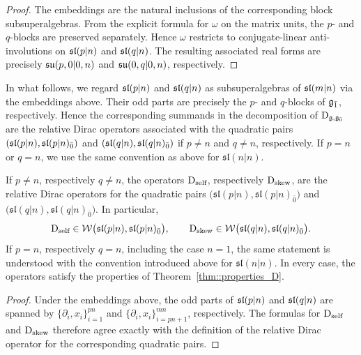  \begin{proof}
The embeddings are the natural inclusions of the corresponding block
subsuperalgebras. From the explicit formula for $\omega$ on the matrix
units, the $p$- and $q$-blocks are preserved separately. Hence $\omega$
restricts to conjugate-linear anti-involutions on
$\sl(p\vert n)$ and $\sl(q\vert n)$. The resulting associated real
forms are precisely $\su(p,0\vert0,n)$ and
$\su(0,q\vert0,n)$, respectively.
\end{proof}

In what follows, we regard $\sl(p\vert n)$ and $\sl(q\vert n)$ as
subsuperalgebras of $\slmn$ via the embeddings above. Their odd parts
are precisely the $p$- and $q$-blocks of $\odd$, respectively. Hence the
corresponding summands in the decomposition of $\Dirac_{\gg,\even}$ are
the relative Dirac operators associated with the quadratic pairs
$(\sl(p\vert n),\sl(p\vert n)_{\bar0})$ and
$(\sl(q\vert n),\sl(q\vert n)_{\bar0})$ if $p\neq n$ and $q \neq n$, respectively. If $p=n$ or $q=n$, we use the same
convention as above for $\mathfrak{sl}(n|n)$. 


\begin{lemma}\label{lemm::properties_D_self_and_D_skew}
If $p\neq n$, respectively $q\neq n$, the operators
$\Dirac_{\self}$, respectively $\Dirac_{\skew}$, are the relative Dirac
operators for the quadratic pairs $\bigl(\mathfrak{sl}(p|n),\mathfrak{sl}(p|n)_{\bar 0}\bigr)$ and $\bigl(\mathfrak{sl}(q|n),\mathfrak{sl}(q|n)_{\bar 0}\bigr).$ In particular,
\begin{equation*}
 \Dirac_{\self}
 \in
 \mathcal{W}\bigl(\sl(p\vert n),\sl(p\vert n)_{\bar0}\bigr), \qquad 
 \Dirac_{\skew}
 \in
 \mathcal{W}\bigl(\sl(q\vert n),\sl(q\vert n)_{\bar0}\bigr).
\end{equation*}
If $p=n$, respectively $q=n$, including the case $n=1$, the same statement is understood with the convention introduced above for $\mathfrak{sl}(n\vert n)$. In every case, the operators satisfy the properties of Theorem~\ref{thm::properties_D}.
\end{lemma}

\begin{proof}
Under the embeddings above, the odd parts of $\sl(p\vert n)$ and
$\sl(q\vert n)$ are spanned by
$\{\partial_i,x_i\}_{i=1}^{pn}$ and
$\{\partial_i,x_i\}_{i=pn+1}^{mn}$, respectively. The formulas for
$\Dirac_{\self}$ and $\Dirac_{\skew}$ therefore agree exactly with the
definition of the relative Dirac operator for the corresponding
quadratic pairs.
\end{proof}

